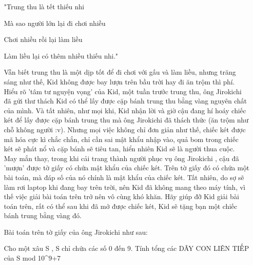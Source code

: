 "Trung thu là tết thiếu nhi

Mà sao người lớn lại đi chơi nhiều

Chơi nhiều rồi lại làm liều

Làm liều lại có thêm nhiều thiếu nhi."

Vẫn biết trung thu là một dịp tốt để đi chơi với gấu và làm liều, nhưng trăng sáng như thế, Kid không được bay lượn trên bầu trời hay đi ăn trộm thì phí. Hiểu rõ 'tâm tư nguyện vọng' của Kid, một tuần trước trung thu, ông Jirokichi đã gửi thư thách Kid có thể lấy được cặp bánh trung thu bằng vàng nguyên chất của mình. Và tất nhiên, như mọi khi, Kid nhận lời và giờ cậu đang hí hoáy chiếc két để lấy được cặp bánh trung thu mà ông Jirokichi đã thách thức (ăn trộm như chỗ không người :v). Nhưng mọi việc không chỉ đơn giản như thế, chiếc két được mã hóa cực kì chắc chắn, chỉ cần sai mật khẩu nhập vào, quả bom trong chiếc két sẽ phát nổ và cặp bánh sẽ tiêu tan, hiển nhiên Kid sẽ là người thua cuộc. May mắn thay, trong khi cải trang thành người phục vụ ông Jirokichi , cậu đã 'mượn' được tờ giấy có chứa mật khẩu của chiếc két. Trên tờ giấy đó có chứa một bài toán, mà đáp số của nó chính là mật khẩu của chiếc két. Tất nhiên, do sợ sẽ làm rơi laptop khi đang bay trên trời, nên Kid đã không mang theo máy tính, vì thế việc giải bài toán trên trở nên vô cùng khó khăn. Hãy giúp đỡ Kid giải bài toán trên, rất có thể sau khi đã mở được chiếc két, Kid sẽ tặng bạn một chiếc bánh trung bằng vàng đó.

Bài toán trên tờ giấy của ông Jirokichi như sau:

Cho một xâu S , S chỉ chứa các số 0 đến 9. Tính tổng các DÃY CON LIÊN TIẾP của S mod 10^9+7